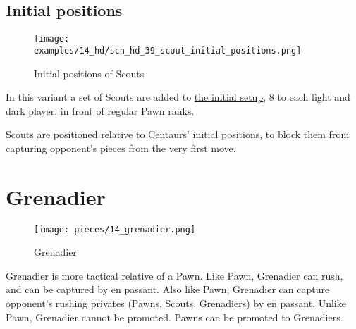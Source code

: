 \clearpage %

\subsection*{Initial positions}
\label{sec:Hemera's Dawn/Scout/Initial positions}

\vspace*{-1.2\baselineskip}
\noindent
\begin{figure}[!h]
\texttt{[image: examples/14\_hd/scn\_hd\_39\_scout\_initial\_positions.png]}
\vspace*{-1.3\baselineskip}
\caption{Initial positions of Scouts}
\label{fig:scn_hd_39_scout_initial_positions}
\end{figure}

\vspace*{-0.5\baselineskip}
In this variant a set of Scouts are added to
\hyperref[fig:14_hemera_s_dawn]{the initial setup}, 8 to each light and dark
player, in front of regular Pawn ranks.

Scouts are positioned relative to Centaurs' initial positions, to block them
from capturing opponent's pieces from the very first move.

\clearpage %

\section*{Grenadier}
\label{sec:Hemera's Dawn/Grenadier}

\vspace*{-0.7\baselineskip}
\noindent
\begin{wrapfigure}[10]{l}{0.4\textwidth}
\centering
\texttt{[image: pieces/14\_grenadier.png]}
\vspace*{-1.3\baselineskip}
\caption{Grenadier}
\label{fig:14_grenadier}
\end{wrapfigure}
Grenadier is more tactical relative of a Pawn. Like Pawn, Grenadier can rush, and
can be captured by en passant. Also like Pawn, Grenadier can capture opponent's
rushing privates (Pawns, Scouts, Grenadiers) by en passant. Unlike Pawn, Grenadier
cannot be promoted. Pawns can be promoted to Grenadiers.

